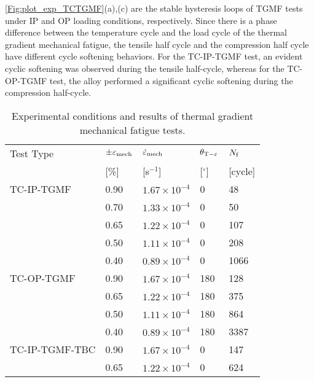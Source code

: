 \ref{Fig:plot_exp_TCTGMF}(a),(c) are the stable hysteresis loops of TGMF tests under IP and OP loading conditions, respectively.
Since there is a phase difference between the temperature cycle and the load cycle of the thermal gradient mechanical fatigue, the tensile half cycle and the compression half cycle have different cycle softening behaviors.
For the TC-IP-TGMF test, an evident cyclic softening was observed during the tensile half-cycle, whereas for the TC-OP-TGMF test, the alloy performed a significant cyclic softening during the compression half-cycle.

\begin{table}[htbp]
  \centering
  \caption{Experimental conditions and results of thermal gradient mechanical fatigue tests.}
    \begin{tabular}{p{4cm}p{1.5cm}<{\centering}p{3cm}<{\centering}p{1.5cm}<{\centering}p{1.5cm}<{\raggedleft}}
    \toprule
    Test Type & $\pm \varepsilon _{\rm{mech}}$ & $\dot \varepsilon _{\rm{mech}}$ & $\theta_{\rm{T-\varepsilon}}$ & $N_{\rm{f}}$ \\
          & [\%]  & [s$^{-1}$] & [$^\circ$] & [cycle] \\
    \midrule
    TC-IP-TGMF & 0.90  & $1.67\times 10^{-4}$ & 0     & 48 \\
          & 0.70  & $1.33\times 10^{-4}$ & 0     & 50 \\
          & 0.65  & $1.22\times 10^{-4}$ & 0     & 107 \\
          & 0.50  & $1.11\times 10^{-4}$ & 0     & 208 \\
          & 0.40  & $0.89\times 10^{-4}$ & 0     & 1066 \\
    \midrule
    TC-OP-TGMF & 0.90  & $1.67\times 10^{-4}$ & 180   & 128 \\
          & 0.65  & $1.22\times 10^{-4}$ & 180   & 375 \\
          & 0.50  & $1.11\times 10^{-4}$ & 180   & 864 \\
          & 0.40  & $0.89\times 10^{-4}$ & 180   & 3387 \\
    \midrule
    TC-IP-TGMF-TBC & 0.90  & $1.67\times 10^{-4}$ & 0     & 147 \\
          & 0.65  & $1.22\times 10^{-4}$ & 0     & 624 \\
    \bottomrule
    \end{tabular}%
  \label{Tab:test_matrix_TGMF}%
\end{table}%


